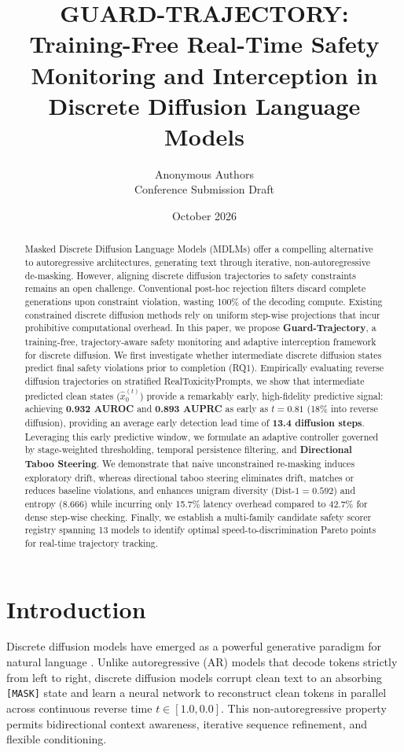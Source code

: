 \documentclass[11pt]{article}
\title{\textbf{GUARD-TRAJECTORY: Training-Free Real-Time Safety Monitoring and Interception in Discrete Diffusion Language Models}}
\author{Anonymous Authors \\ Conference Submission Draft}
\date{October 2026}
\begin{document}
\maketitle

\begin{abstract}
Masked Discrete Diffusion Language Models (MDLMs) offer a compelling alternative to autoregressive architectures, generating text through iterative, non-autoregressive de-masking. However, aligning discrete diffusion trajectories to safety constraints remains an open challenge. Conventional post-hoc rejection filters discard complete generations upon constraint violation, wasting 100\% of the decoding compute. Existing constrained discrete diffusion methods rely on uniform step-wise projections that incur prohibitive computational overhead. In this paper, we propose \textbf{Guard-Trajectory}, a training-free, trajectory-aware safety monitoring and adaptive interception framework for discrete diffusion. We first investigate whether intermediate discrete diffusion states predict final safety violations prior to completion (RQ1). Empirically evaluating reverse diffusion trajectories on stratified RealToxicityPrompts, we show that intermediate predicted clean states ($\hat{x}_0^{(t)}$) provide a remarkably early, high-fidelity predictive signal: achieving \textbf{0.932 AUROC} and \textbf{0.893 AUPRC} as early as $t=0.81$ (18\% into reverse diffusion), providing an average early detection lead time of \textbf{13.4 diffusion steps}. Leveraging this early predictive window, we formulate an adaptive controller governed by stage-weighted thresholding, temporal persistence filtering, and \textbf{Directional Taboo Steering}. We demonstrate that naive unconstrained re-masking induces exploratory drift, whereas directional taboo steering eliminates drift, matches or reduces baseline violations, and enhances unigram diversity ($\text{Dist-1}=0.592$) and entropy ($8.666$) while incurring only 15.7\% latency overhead compared to 42.7\% for dense step-wise checking. Finally, we establish a multi-family candidate safety scorer registry spanning 13 models to identify optimal speed-to-discrimination Pareto points for real-time trajectory tracking.
\end{abstract}

\section{Introduction}
Discrete diffusion models have emerged as a powerful generative paradigm for natural language \cite{austin2021structured,sahoo2024simple}. Unlike autoregressive (AR) models that decode tokens strictly from left to right, discrete diffusion models corrupt clean text to an absorbing \texttt{[MASK]} state and learn a neural network to reconstruct clean tokens in parallel across continuous reverse time $t \in [1.0, 0.0]$. This non-autoregressive property permits bidirectional context awareness, iterative sequence refinement, and flexible conditioning.
\end{document}

